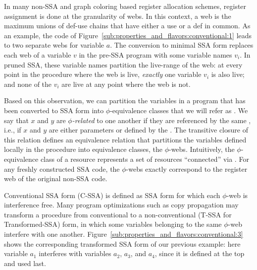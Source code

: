 In many non-SSA and graph coloring based register allocation schemes, register assignment is done at the granularity of webs. 
In this context, a web is the maximum unions of def-use chains that have either a use or a def in common. 
As an example, the code of Figure~\ref{sub:properties_and_flavors:conventional:1} leads to two separate webs for variable $a$. 
The conversion to minimal SSA form replaces each web of a variable $v$ in the pre-SSA program with some variable names $v_i$. 
In pruned SSA, these variable names partition the live-range of the web: 
at every point in the procedure where the web is live, \emph{exactly} one variable $v_{i}$ is also live; 
and none of the $v_{i}$ are live at any point where the web is not.


Based on this observation, we can partition the variables in a program that has been converted to SSA form into $\phi$-equivalence classes that we will refer as \phiwebs.\index{\phiweb} We say that $x$ and $y$ are \emph{$\phi$-related} to one another if they are referenced by the same \phifun, i.e., if $x$ and $y$ are either parameters or defined by the \phifun. 
The transitive closure of this relation defines an equivalence relation that partitions the variables defined locally in the procedure into equivalence classes, the $\phi$-webs. 
Intuitively, the $\phi$-equivalence class of a resource represents a set of resources ``connected'' via \phifuns. 
For any freshly constructed SSA code, the $\phi$-webs exactly correspond to the register web of the original non-SSA code.

Conventional SSA form (C-SSA) is defined as SSA form for which each $\phi$-web is interference free. 
Many program optimizations such as copy propagation may transform a procedure from conventional to a non-conventional (T-SSA for Transformed-SSA) form, in which some variables belonging to the same $\phi$-web interfere with one another. 
Figure~\ref{sub:properties_and_flavors:conventional:3} shows the corresponding transformed SSA form of our previous example:  here variable $a_1$ interferes with variables $a_2$, $a_3$, and $a_4$, since it is defined at the top and used last.

